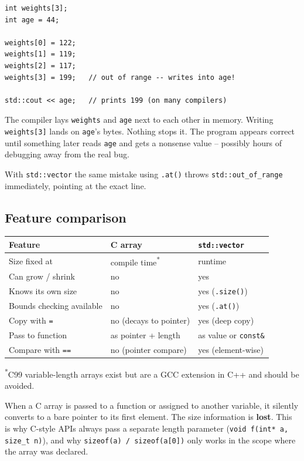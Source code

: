 \documentclass[11pt]{article}
\begin{document}
\begin{warnbox}
\begin{verbatim}
int weights[3];
int age = 44;

weights[0] = 122;
weights[1] = 119;
weights[2] = 117;
weights[3] = 199;   // out of range -- writes into age!

std::cout << age;   // prints 199 (on many compilers)
\end{verbatim}
The compiler lays \texttt{weights} and \texttt{age} next to each other
in memory. Writing \texttt{weights[3]} lands on \texttt{age}'s bytes.
Nothing stops it. The program appears correct until something later
reads \texttt{age} and gets a nonsense value -- possibly hours of
debugging away from the real bug.
\end{warnbox}

With \texttt{std::vector} the same mistake using \texttt{.at()} throws
\texttt{std::out\_of\_range} immediately, pointing at the exact line.

\subsection{Feature comparison}

\begin{center}
\begin{tabular}{lll}
\textbf{Feature} & \textbf{C array} & \texttt{std::vector} \\
\hline
Size fixed at & compile time\textsuperscript{*} & runtime \\
Can grow / shrink & no & yes \\
Knows its own size & no & yes (\texttt{.size()}) \\
Bounds checking available & no & yes (\texttt{.at()}) \\
Copy with \texttt{=} & no (decays to pointer) & yes (deep copy) \\
Pass to function & as pointer + length & as value or \texttt{const\&} \\
Compare with \texttt{==} & no (pointer compare) & yes (element-wise) \\
\end{tabular}
\end{center}

\noindent\small\textsuperscript{*}C99 variable-length arrays exist but
are a GCC extension in C++ and should be avoided.\normalsize

\begin{defnbox}
When a C array is passed to a function or assigned to another variable,
it silently converts to a bare pointer to its first element. The size
information is \textbf{lost}. This is why C-style APIs always pass a
separate length parameter (\texttt{void f(int* a, size\_t n)}), and why
\texttt{sizeof(a) / sizeof(a[0])} only works in the scope where the
array was declared.
\end{defnbox}
\end{document}
